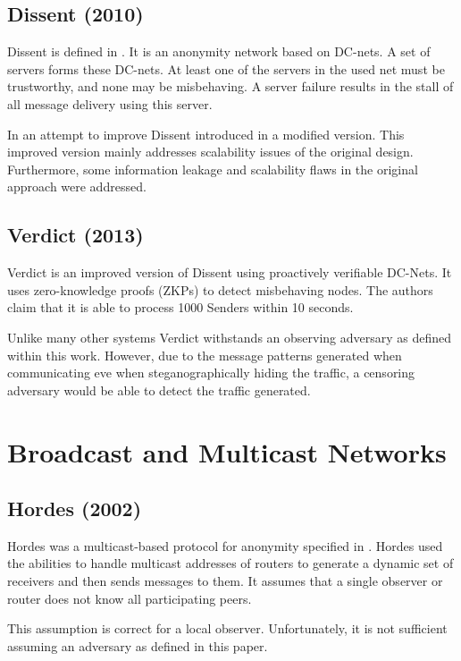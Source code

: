 \subsection{Dissent (2010)}
Dissent is defined in \cite{Corrigan-Gibbs:2010:DAA:1866307.1866346}. It is an anonymity network based on DC-nets. A set of servers forms these DC-nets. At least one of the servers in the used net must be trustworthy, and none may be misbehaving. A server failure results in the stall of all message delivery using this server.

In an attempt to improve Dissent \citeauthor{wolinsky2012dissent} introduced in \cite{wolinsky2012dissent} a modified version. This improved version mainly addresses scalability issues of the original design. Furthermore, some information leakage and scalability flaws in the original approach were addressed.

\subsection{Verdict (2013)}
Verdict\cite{180367} is an improved version of Dissent using proactively verifiable DC-Nets. It uses zero-knowledge proofs (ZKPs) to detect misbehaving nodes. The authors claim that it is able to process 1000 Senders within 10 seconds.

Unlike many other systems Verdict withstands an observing adversary as defined within this work. However, due to the message patterns generated when communicating eve when steganographically hiding the traffic, a censoring adversary would be able to detect the traffic generated.


\section{Broadcast and Multicast Networks}
\subsection{Hordes (2002)}
Hordes was a multicast-based protocol for anonymity specified in \cite{Levine:2002}. Hordes used the abilities to handle multicast addresses of routers to generate a dynamic set of receivers and then sends messages to them. It assumes that a single observer or router does not know all participating peers. 


This assumption is correct for a local observer. Unfortunately, it is not sufficient assuming an adversary as defined in this paper.

